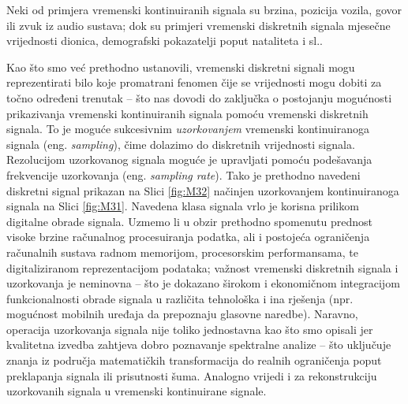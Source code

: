 \documentclass[a4paper,12pt,oneside]{memoir}
\begin{document}
            
            Neki od primjera vremenski kontinuiranih signala su brzina, pozicija vozila, govor ili zvuk iz audio sustava; dok su primjeri vremenski diskretnih signala mjesečne vrijednosti dionica, demografski pokazatelji poput nataliteta i sl..
            
            Kao što smo već prethodno ustanovili, vremenski diskretni signali mogu reprezentirati bilo koje promatrani fenomen čije se vrijednosti mogu dobiti za točno određeni trenutak -- što nas dovodi do zaključka o postojanju mogućnosti prikazivanja vremenski kontinuiranih signala pomoću vremenski diskretnih signala. To je moguće sukcesivnim \textit{uzorkovanjem} vremenski kontinuiranoga signala (eng. \textit{sampling}), čime dolazimo do diskretnih vrijednosti signala. Rezolucijom uzorkovanog signala moguće je upravljati pomoću podešavanja frekvencije uzorkovanja (eng. \textit{sampling rate}). Tako je prethodno navedeni diskretni signal prikazan na Slici \ref{fig:M32} načinjen uzorkovanjem kontinuiranoga signala na Slici \ref{fig:M31}.  Navedena klasa signala vrlo je korisna prilikom digitalne obrade signala. Uzmemo li u obzir prethodno spomenutu prednost visoke brzine računalnog procesuiranja podatka, ali i postojeća ograničenja računalnih sustava radnom memorijom, procesorskim performansama, te digitaliziranom reprezentacijom podataka; važnost vremenski diskretnih signala i uzorkovanja je neminovna -- što je dokazano širokom i ekonomičnom integracijom funkcionalnosti obrade signala u različita tehnološka i ina rješenja (npr. mogućnost mobilnih uređaja da prepoznaju glasovne naredbe). Naravno, operacija uzorkovanja signala nije toliko jednostavna kao što smo opisali jer kvalitetna izvedba zahtjeva dobro poznavanje spektralne analize -- što uključuje znanja iz područja matematičkih transformacija do realnih ograničenja poput preklapanja signala ili prisutnosti šuma. Analogno vrijedi i za rekonstrukciju uzorkovanih signala u vremenski kontinuirane signale.
\end{document}
